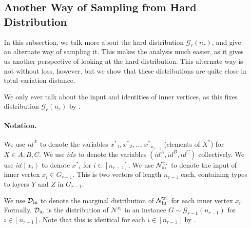 \documentclass[11pt]{article}
\theoremstyle{definition}
\newcommand{\xstar}{\ensuremath{x^{*}}}
\newcommand{\Xstar}{\ensuremath{X^{*}}}
\newcommand{\Nbtogether}[2]{\ensuremath{\mathcal{N}^{#1_{#2}}}}
\newcommand{\Ninner}[2]{\ensuremath{\mathcal{N}_{\textnormal{in}}^{#1_{#2}}}}
\newcommand{\cD}{\ensuremath{\mathcal{D}}}
\newcommand{\cG}{\ensuremath{\mathcal{G}}}
\newcommand{\cDmarg}{\ensuremath{\cD_{\textnormal{in}}}}
\newcommand{\idlayer}[1]{\ensuremath{id^{#1}}}
\newcommand{\id}[1]{\ensuremath{id(#1)}}
\newcommand{\ids}{\ensuremath{ids}}
\begin{document}

\subsection{Another Way of Sampling from Hard Distribution}
In this subsection, we talk more about the hard distribution $\cG_r(n_r)$, and give an alternate way of sampling it. This makes the analysis much easier, as it gives us another perspective of looking at the hard distribution. This alternate way is not without loss, however, but we show that these distributions are quite close in total variation distance. 

 We only ever talk about the input and identities of inner vertices, as this fixes distribution $\cG_r(n_r)$ by . 

\paragraph{Notation.}
We use $\idlayer{X}$ to denote the variables $\xstar_1, \xstar_2, \ldots, \xstar_{n_{r-1}}$ (elements of $\Xstar$) for $X\in {A, B, C}$. We use $\ids$ to denote the variables $(\idlayer{A}, \idlayer{B}, \idlayer{C})$ collectively.
We use $\id{x_i}$ to denote $\xstar_i$ for $i \in [n_{r-1}]$.
We use $\Ninner{x}{i}$ to denote the input of inner vertex $x_i \in G_{r-1}$. This is two vectors of length $n_{r-1}$ each, containing types to layers $Y$ and $Z$ in $G_{r-1}$. 

We use $\cDmarg$ to denote the marginal distribution of $\Ninner{x}{i}$ for each inner vertex $x_i$. Formally, $\cDmarg{}$ is the distribution of $\Nbtogether{x}{i}$ in an instance $G \sim \cG_{r-1}(n_{r-1})$ for $i \in [n_{r-1}]$. Note that this is identical for each $i \in [n_{r-1}]$ by .
\end{document}
